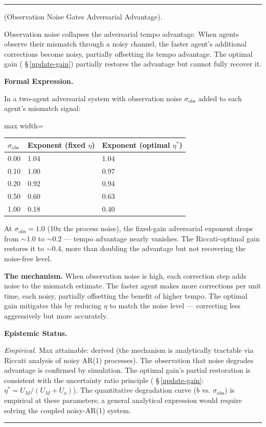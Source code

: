 \documentclass[11pt,oneside]{article}
\newcounter{claim}[section]
\renewcommand{\theclaim}{\thesection.\arabic{claim}}
\newenvironment{segment}[2]{%
  \refstepcounter{claim}%
  \bigskip\noindent\hrule\smallskip
  \noindent{\bfseries #1~\theclaim}\enskip(#2).\par\smallskip
  \noindent\ignorespaces
}{%
  \par\smallskip\noindent\hrule\bigskip
}
\newenvironment{observation}[1][]{\begin{segment}{Observation}{#1}}{\end{segment}}
\begin{document}
\begin{observation}[Observation Noise Gates Adversarial Advantage]
\label{observation-gates-advantage}
Observation noise collapses the adversarial tempo advantage. When agents observe their mismatch through a noisy channel, the faster agent's additional corrections become noisy, partially offsetting its tempo advantage. The optimal gain ( \S\,\ref{update-gain}) partially restores the advantage but cannot fully recover it.



\medskip\noindent\textbf{Formal Expression.}



In a two-agent adversarial system with observation noise $\sigma_{\text{obs}}$ added to each agent's mismatch signal:

\begin{adjustbox}{max width=\textwidth}
\small
\begin{tabular}{lll}
\toprule
$\sigma_{\text{obs}}$ & Exponent (fixed $\eta$) & Exponent (optimal $\eta^*$) \\
\midrule
0.00 & 1.04 & 1.04 \\
0.10 & 1.00 & 0.97 \\
0.20 & 0.92 & 0.94 \\
0.50 & 0.60 & 0.63 \\
1.00 & 0.18 & 0.40 \\
\bottomrule
\end{tabular}
\end{adjustbox}


At $\sigma_{\text{obs}} = 1.0$ (10x the process noise), the fixed-gain adversarial exponent drops from $\sim 1.0$ to $\sim 0.2$ — tempo advantage nearly vanishes. The Riccati-optimal gain restores it to $\sim 0.4$, more than doubling the advantage but not recovering the noise-free level.

\textbf{The mechanism.} When observation noise is high, each correction step adds noise to the mismatch estimate. The faster agent makes more corrections per unit time, each noisy, partially offsetting the benefit of higher tempo. The optimal gain mitigates this by reducing $\eta$ to match the noise level — correcting less aggressively but more accurately.


\medskip\noindent\textbf{Epistemic Status.}


\textit{Empirical.} Max attainable: derived (the mechanism is analytically tractable via Riccati analysis of noisy AR(1) processes). The observation that noise degrades advantage is confirmed by simulation. The optimal gain's partial restoration is consistent with the uncertainty ratio principle ( \S\,\ref{update-gain}: $\eta^* = U_M / (U_M + U_o)$). The quantitative degradation curve ($b$ vs. $\sigma_{\text{obs}}$) is empirical at these parameters; a general analytical expression would require solving the coupled noisy-AR(1) system.



\end{observation}
\end{document}
